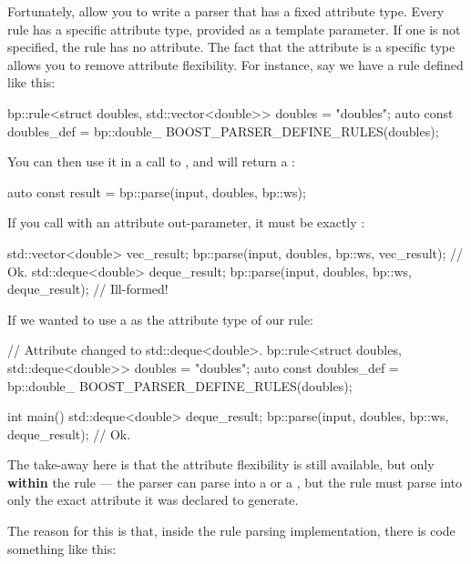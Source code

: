 \documentclass{MyBook}
\begin{document}
Fortunately,  allow you to write a parser that has a fixed attribute type. Every rule has a specific attribute type, provided as a template parameter. If one is not specified, the rule has no attribute. The fact that the attribute is a specific type allows you to remove attribute flexibility. For instance, say we have a rule defined like this:

\begin{code}
bp::rule<struct doubles, std::vector<double>> doubles = "doubles";
auto const doubles_def = bp::double_ %
BOOST_PARSER_DEFINE_RULES(doubles);
\end{code}

You can then use it in a call to , and  will return a :

\begin{code}
auto const result = bp::parse(input, doubles, bp::ws);
\end{code}

If you call  with an attribute out-parameter, it must be exactly :

\begin{code}
std::vector<double> vec_result;
bp::parse(input, doubles, bp::ws, vec_result); // Ok.
std::deque<double> deque_result;
bp::parse(input, doubles, bp::ws, deque_result); // Ill-formed!
\end{code}

If we wanted to use a  as the attribute type of our rule:

\begin{code}
// Attribute changed to std::deque<double>.
bp::rule<struct doubles, std::deque<double>> doubles = "doubles";
auto const doubles_def = bp::double_ %
BOOST_PARSER_DEFINE_RULES(doubles);

int main()
{
    std::deque<double> deque_result;
    bp::parse(input, doubles, bp::ws, deque_result); // Ok.
}
\end{code}

The take-away here is that the attribute flexibility is still available, but only \textbf{within} the rule --- the parser  can parse into a  or a , but the rule  must parse into only the exact attribute it was declared to generate.

The reason for this is that, inside the rule parsing implementation, there is code something like this:
\end{document}
